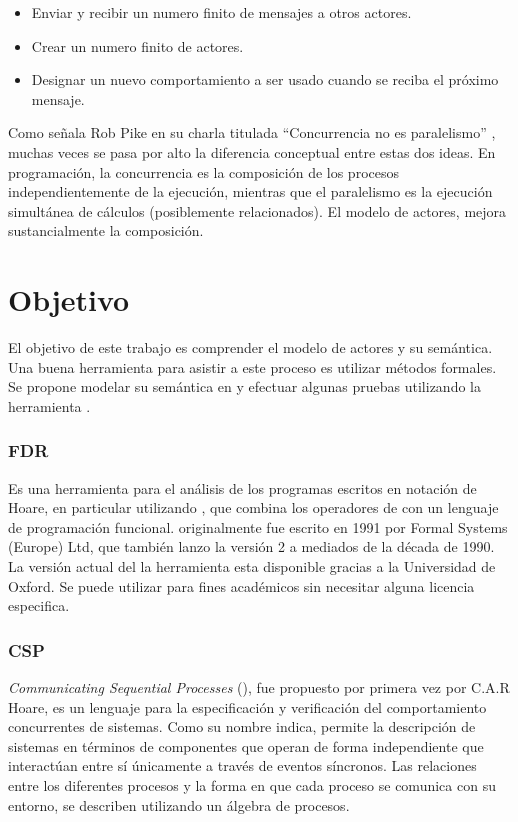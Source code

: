 \begin{itemize}
\item Enviar y recibir un numero finito de mensajes a otros actores.
\item Crear un numero finito de actores.
\item Designar un nuevo comportamiento a ser usado cuando se reciba el próximo mensaje.
\end{itemize}

Como señala Rob Pike en su charla titulada ``Concurrencia no es paralelismo'' \cite{rpike13_cnp}, muchas veces se pasa por alto la diferencia conceptual entre estas dos ideas. En programación, la concurrencia es la composición de los procesos independientemente de la ejecución, mientras que el paralelismo es la ejecución simultánea de cálculos (posiblemente relacionados). El modelo de actores, mejora sustancialmente la composición.

\section{Objetivo}
El objetivo de este trabajo es comprender el modelo de actores y su semántica. Una buena herramienta para asistir a este proceso es utilizar métodos formales. Se propone modelar su semántica en \CSP y efectuar algunas pruebas utilizando la herramienta \FDR\cite{fdr}.

\subsubsection*{FDR}

Es una herramienta para el análisis de los programas escritos en notación \CSP de Hoare, en particular utilizando \CSPm, que combina los operadores de \CSP con un lenguaje de programación funcional. \FDR originalmente fue escrito en 1991 por Formal Systems (Europe) Ltd, que también lanzo la versión 2 a mediados de la década de 1990. La versión actual del la herramienta esta disponible gracias a la Universidad de Oxford. Se puede utilizar para fines académicos sin necesitar alguna licencia especifica. 

\subsubsection*{CSP}

\textit{Communicating Sequential Processes} (\CSP), fue propuesto por primera vez por C.A.R Hoare\cite{Hoare:1978:CSP:359576.359585}, es un lenguaje para la especificación y verificación del comportamiento concurrentes de sistemas. Como su nombre indica, \CSP permite la descripción de sistemas en términos de componentes que operan de forma independiente que interactúan entre sí únicamente a través de eventos síncronos. Las relaciones entre los diferentes procesos y la forma en que cada proceso se comunica con su entorno, se describen utilizando un álgebra de procesos.

